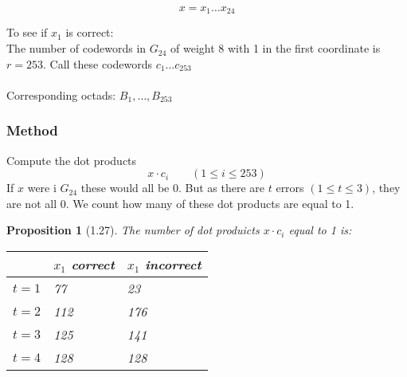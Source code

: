 \documentclass[]{article}
\newtheorem{prop}[thm]{Proposition}
\theoremstyle{definition}
\theoremstyle{remark}
\numberwithin{equation}{section}
\begin{document}
		\[
			x= x_1\hdots x_24
		\]

		To see if $x_1$ is correct:\\
		The number of codewords in $G_{24}$ of weight 8 with 1 in the first coordinate is $r=253$. Call these codewords $c_1 \hdots c_{253}$\\
		\\
		Corresponding octads: $B_1, \hdots, B_{253}$
		\subsubsection{Method}
		Compute the dot products
		\[
			x \cdot c_i \qquad (1 \leq i \leq 253)
		\]
		If $x$ were i $G_{24}$ these would all be 0. But as there are $t$ errors $(1\leq t \leq 3)$, they are not all 0. We count how many of these dot products are equal to 1.

		\begin{prop}[1.27]\hfill
		The number of dot produicts $x \cdot c_i$ equal to 1 is:
		\begin{centering}
		\begin{table}[h]
		\begin{tabular}{|l|l|l|}
			\hline
			    & $x_1$ correct  & $x_1$ incorrect \\ \hline
			$t=1$ & 77           & 23             \\
			$t=2$ & 112          & 176            \\
			$t=3$ & 125          & 141            \\
			$t=4$ & 128          & 128           \\ \hline
			\end{tabular}
		\end{table}
		\end{centering}
		\end{prop}
\end{document}
